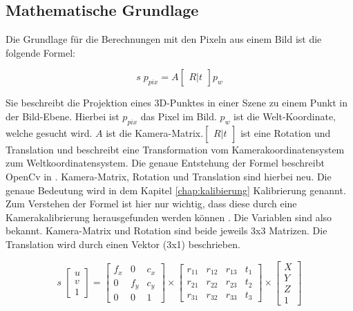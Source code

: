 	\subsection{Mathematische Grundlage}
	Die Grundlage für die Berechnungen mit den Pixeln aus einem Bild ist die folgende Formel:
	
	\begin{equation}
	s \; p_{pix} = A \begin{bmatrix} R|t \end{bmatrix} p_w
	\label{eq:basic_trans}
	\end{equation}
	
	Sie beschreibt die Projektion eines 3D-Punktes in einer Szene zu einem Punkt in der Bild-Ebene. Hierbei ist \( p_{pix} \) das Pixel im Bild. \( p_w \) ist die Welt-Koordinate, welche gesucht wird. \( A \) ist die Kamera-Matrix.\( \begin{bmatrix} R|t \end{bmatrix} \) ist eine Rotation und Translation und beschreibt eine Transformation vom Kamerakoordinatensystem zum Weltkoordinatensystem. Die genaue Entstehung der Formel beschreibt OpenCv in \citep[vgl.][]{noauthor_opencv_nodate-2}. Kamera-Matrix, Rotation und Translation sind hierbei neu. Die genaue Bedeutung wird in dem Kapitel \ref{chap:kalibierung} Kalibrierung genannt. Zum Verstehen der Formel ist hier nur wichtig, dass diese durch eine Kamerakalibrierung herausgefunden werden können \citep[vgl.][]{dawson-howe_simple_1994}. Die Variablen sind also bekannt. Kamera-Matrix und Rotation sind beide jeweils 3x3 Matrizen. Die Translation wird durch einen Vektor (3x1) beschrieben. 
	
	\begin{equation}
	s \; \begin{bmatrix}
	u \\ 
	v \\ 
	1
	\end{bmatrix} = \begin{bmatrix}
	f_x & 0 & c_x \\
	0 & f_y & c_y \\
	0 & 0 & 1
	\end{bmatrix} \times \begin{bmatrix}
	r_{11} & r_{12} & r_{13} & t_1 \\ 
	r_{21} & r_{22} & r_{23} & t_2 \\ 
	r_{31} & r_{32} & r_{33} & t_3
	\end{bmatrix} \times \begin{bmatrix}
	X \\ 
	Y \\ 
	Z \\
	1
	\end{bmatrix}
	\label{eq:basic_trans_complete}
	\end{equation}
	
